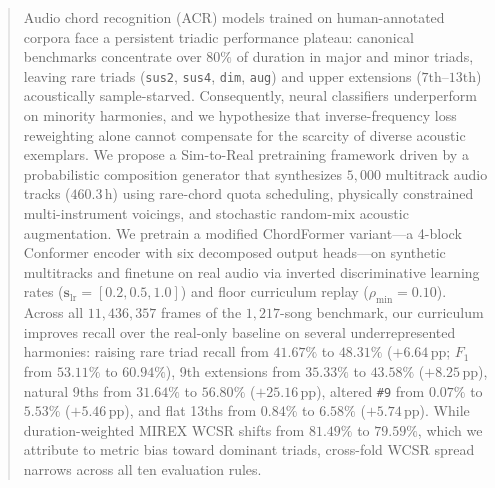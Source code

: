 \begin{abstract}
Audio chord recognition (ACR) models trained on human-annotated corpora face a persistent triadic performance plateau: canonical benchmarks concentrate over $80\%$ of duration in major and minor triads, leaving rare triads ({\small\texttt{sus2}}, {\small\texttt{sus4}}, {\small\texttt{dim}}, {\small\texttt{aug}}) and upper extensions ($7\text{th}$--$13\text{th}$) acoustically sample-starved. Consequently, neural classifiers underperform on minority harmonies, and we hypothesize that inverse-frequency loss reweighting alone cannot compensate for the scarcity of diverse acoustic exemplars. We propose a Sim-to-Real pretraining framework driven by a probabilistic composition generator that synthesizes $5{,}000$ multitrack audio tracks ($460.3\,\text{h}$) using rare-chord quota scheduling, physically constrained multi-instrument voicings, and stochastic random-mix acoustic augmentation. We pretrain a modified ChordFormer variant---a 4-block Conformer encoder with six decomposed output heads---on synthetic multitracks and finetune on real audio via inverted discriminative learning rates ($\mathbf{s}_{\text{lr}} = [0.2, 0.5, 1.0]$) and floor curriculum replay ($\rho_{\min}=0.10$). Across all $11{,}436{,}357$ frames of the $1{,}217$-song benchmark, our curriculum improves recall over the real-only baseline on several underrepresented harmonies: raising rare triad recall from $41.67\%$ to $48.31\%$ ($+6.64\,\text{pp}$; $F_1$ from $53.11\%$ to $60.94\%$), 9th extensions from $35.33\%$ to $43.58\%$ ($+8.25\,\text{pp}$), natural 9ths from $31.64\%$ to $56.80\%$ ($+25.16\,\text{pp}$), altered {\small\texttt{\#9}} from $0.07\%$ to $5.53\%$ ($+5.46\,\text{pp}$), and flat 13ths from $0.84\%$ to $6.58\%$ ($+5.74\,\text{pp}$). While duration-weighted MIREX WCSR shifts from $81.49\%$ to $79.59\%$, which we attribute to metric bias toward dominant triads, cross-fold WCSR spread narrows across all ten evaluation rules.
\end{abstract}
